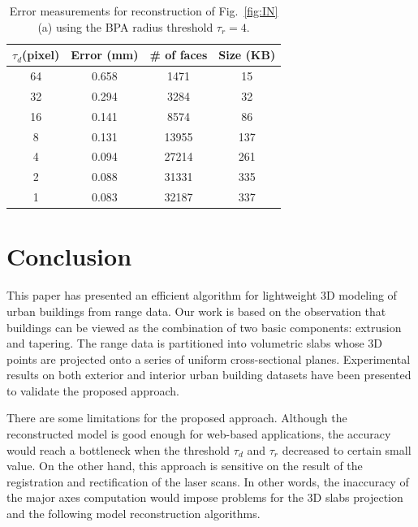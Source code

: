 \documentclass{article}
\newcommand{\Figa}[1]{Fig.~\ref{fig:#1}(a)}
\begin{document}
\setlength{\tabcolsep}{4pt}
\begin{table}[hbtp]
\begin{center}
\begin{tabular}[t]{||c||c|c|c||}
\hline
$\tau_{d} $(pixel) & Error (mm)& \# of faces & Size (KB) \\ \hline \hline
64 & 0.658 & 1471  & 15  \\ \hline
32 & 0.294 & 3284  & 32  \\ \hline
16 & 0.141 & 8574  & 86  \\ \hline
8  & 0.131 & 13955 & 137 \\ \hline
4  & 0.094 & 27214 & 261 \\ \hline
2  & 0.088 & 31331 & 335 \\ \hline
1  & 0.083 & 32187 & 337 \\ \hline
\end{tabular}
\end{center}
\caption{Error measurements for reconstruction of \Figa{IN} using
the BPA radius threshold $\tau_r = 4$.}
\label{tbl:em}
\end{table}
\setlength{\tabcolsep}{1.4pt}

\section{Conclusion}

This paper has presented an efficient algorithm for lightweight 3D modeling
of urban buildings from range data.
Our work is based on the observation that buildings can be viewed as the
combination of two basic components: extrusion and tapering.
The range data is partitioned into volumetric slabs whose 3D points are
projected onto a series of uniform cross-sectional planes.
Experimental results on both exterior and interior urban building datasets
have been presented to validate the proposed approach.

There are some limitations for the proposed approach. 
Although the reconstructed model is good enough for web-based applications,
the accuracy would reach a bottleneck when the threshold $\tau_d$ and $\tau_r$ decreased to
certain small value. On the other hand, this approach is sensitive on 
the result of the registration and rectification of the laser scans. 
In other words, the inaccuracy of the major axes computation would impose problems for
the 3D slabs projection and the following model reconstruction algorithms.
\end{document}
